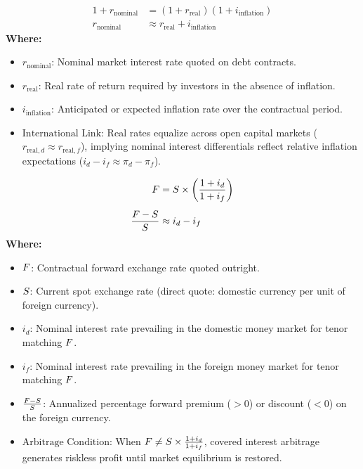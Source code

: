 \begin{formulabox}
\begin{align*}
    1 + r_{\text{nominal}} &= (1 + r_{\text{real}})(1 + i_{\text{inflation}}) \\[0.4em]
    r_{\text{nominal}} &\approx r_{\text{real}} + i_{\text{inflation}}
\end{align*}
\textbf{Where:}
\begin{itemize}[leftmargin=*, noitemsep]
    \item $r_{\text{nominal}}$: Nominal market interest rate quoted on debt contracts.
    \item $r_{\text{real}}$: Real rate of return required by investors in the absence of inflation.
    \item $i_{\text{inflation}}$: Anticipated or expected inflation rate over the contractual period.
    \item $\text{International Link}$: Real rates equalize across open capital markets ($r_{\text{real}, d} \approx r_{\text{real}, f}$), implying nominal interest differentials reflect relative inflation expectations ($i_d - i_f \approx \pi_d - \pi_f$).
\end{itemize}
\end{formulabox}

\begin{formulabox}
\begin{align*}
    F &= S \times \left( \frac{1 + i_d}{1 + i_f} \right) \\[0.5em]
    \frac{F - S}{S} &\approx i_d - i_f
\end{align*}
\textbf{Where:}
\begin{itemize}[leftmargin=*, noitemsep]
    \item $F$: Contractual forward exchange rate quoted outright.
    \item $S$: Current spot exchange rate (direct quote: domestic currency per unit of foreign currency).
    \item $i_d$: Nominal interest rate prevailing in the domestic money market for tenor matching $F$.
    \item $i_f$: Nominal interest rate prevailing in the foreign money market for tenor matching $F$.
    \item $\frac{F - S}{S}$: Annualized percentage forward premium ($>0$) or discount ($<0$) on the foreign currency.
    \item $\text{Arbitrage Condition}$: When $F \neq S \times \frac{1+i_d}{1+i_f}$, covered interest arbitrage generates riskless profit until market equilibrium is restored.
\end{itemize}
\end{formulabox}


